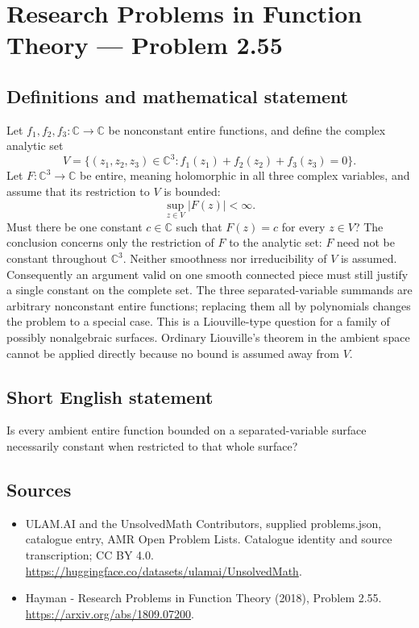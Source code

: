 \documentclass[11pt,a4paper]{article}
\begin{document}
\section*{Research Problems in Function Theory — Problem 2.55}\label{statement}

\subsection{Definitions and mathematical statement}
Let $f_1,f_2,f_3:\mathbb C\to\mathbb C$ be nonconstant entire functions, and define the complex analytic set
\[
V=\{(z_1,z_2,z_3)\in\mathbb C^3:
 f_1(z_1)+f_2(z_2)+f_3(z_3)=0\}.
\]
Let $F:\mathbb C^3\to\mathbb C$ be entire, meaning holomorphic in all three complex variables, and assume that its restriction to $V$ is bounded:
\[
\sup_{z\in V}|F(z)|<\infty.
\]
Must there be one constant $c\in\mathbb C$ such that $F(z)=c$ for every $z\in V$?
The conclusion concerns only the restriction of $F$ to the analytic set: $F$ need not be constant throughout $\mathbb C^3$. Neither smoothness nor irreducibility of $V$ is assumed. Consequently an argument valid on one smooth connected piece must still justify a single constant on the complete set. The three separated-variable summands are arbitrary nonconstant entire functions; replacing them all by polynomials changes the problem to a special case.
This is a Liouville-type question for a family of possibly nonalgebraic surfaces. Ordinary Liouville's theorem in the ambient space cannot be applied directly because no bound is assumed away from $V$.
\subsection{Short English statement}
Is every ambient entire function bounded on a separated-variable surface necessarily constant when restricted to that whole surface?
\subsection{Sources}
\begin{itemize}
\item[S1] ULAM.AI and the UnsolvedMath Contributors, supplied problems.json, catalogue entry, AMR Open Problem Lists. Catalogue identity and source transcription; CC BY 4.0.
\url{https://huggingface.co/datasets/ulamai/UnsolvedMath}.
\item[S2] Hayman - Research Problems in Function Theory (2018), Problem 2.55. 
\url{https://arxiv.org/abs/1809.07200}.
\end{itemize}
\end{document}
